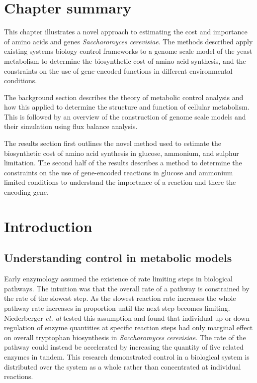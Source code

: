 \section*{Chapter summary}%

This chapter illustrates a novel approach to estimating the cost and importance of amino acids and genes \emph{Saccharomyces cerevisiae}. The methods described apply existing systems biology control frameworks to a genome scale model of the yeast metabolism to determine the biosynthetic cost of amino acid synthesis, and the constraints on the use of gene-encoded functions in different environmental conditions.

The background section describes the theory of metabolic control analysis and how this applied to determine the structure and function of cellular metabolism. This is followed by an overview of the construction of genome scale models and their simulation using flux balance analysis.

The results section first outlines the novel method used to estimate the biosynthetic cost of amino acid synthesis in glucose, ammonium, and sulphur limitation. The second half of the results describes a method to determine the constraints on the use of gene-encoded reactions in glucose and ammonium limited conditions to understand the importance of a reaction and there the encoding gene.

\clearpage

\section{Introduction} %

\subsection{Understanding control in metabolic models}

Early enzymology assumed the existence of rate limiting steps in biological pathways. The intuition was that the overall rate of a pathway is constrained by the rate of the slowest step. As the slowest reaction rate increases the whole pathway rate increases in proportion until the next step becomes limiting. Niederberger \emph{et. al} \cite{niederberger1992} tested this assumption and found that individual up or down regulation of enzyme quantities at specific reaction steps had only marginal effect on overall tryptophan biosynthesis in \emph{Saccharomyces cerevisiae}. The rate of the pathway could instead be accelerated by increasing the quantity of five related enzymes in tandem. This research demonstrated control in a biological system is distributed over the system as a whole rather than concentrated at individual reactions.

